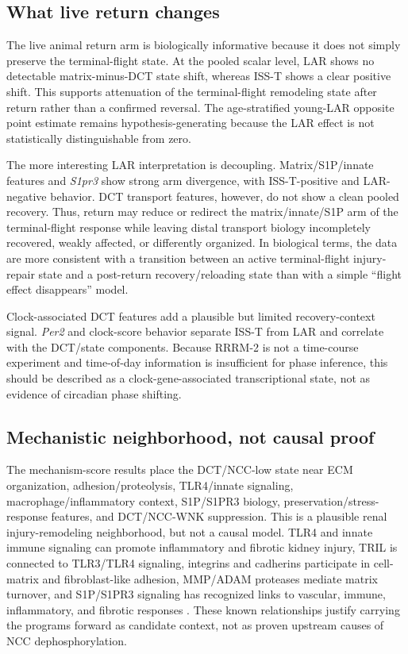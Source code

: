 \documentclass[11pt]{article}
\newcommand{\gene}[1]{\textit{#1}}
\begin{document}
\subsection{What live return changes}

The live animal return arm is biologically informative because it does not simply preserve the terminal-flight state. At the pooled scalar level, LAR shows no detectable matrix-minus-DCT state shift, whereas ISS-T shows a clear positive shift. This supports attenuation of the terminal-flight remodeling state after return rather than a confirmed reversal. The age-stratified young-LAR opposite point estimate remains hypothesis-generating because the LAR effect is not statistically distinguishable from zero.

The more interesting LAR interpretation is decoupling. Matrix/S1P/innate features and \gene{S1pr3} show strong arm divergence, with ISS-T-positive and LAR-negative behavior. DCT transport features, however, do not show a clean pooled recovery. Thus, return may reduce or redirect the matrix/innate/S1P arm of the terminal-flight response while leaving distal transport biology incompletely recovered, weakly affected, or differently organized. In biological terms, the data are more consistent with a transition between an active terminal-flight injury-repair state and a post-return recovery/reloading state than with a simple ``flight effect disappears'' model.

Clock-associated DCT features add a plausible but limited recovery-context signal. \gene{Per2} and clock-score behavior separate ISS-T from LAR and correlate with the DCT/state components. Because RRRM-2 is not a time-course experiment and time-of-day information is insufficient for phase inference, this should be described as a clock-gene-associated transcriptional state, not as evidence of circadian phase shifting.

\subsection{Mechanistic neighborhood, not causal proof}

The mechanism-score results place the DCT/NCC-low state near ECM organization, adhesion/proteolysis, TLR4/innate signaling, macrophage/inflammatory context, S1P/S1PR3 biology, preservation/stress-response features, and DCT/NCC-WNK suppression. This is a plausible renal injury-remodeling neighborhood, but not a causal model. TLR4 and innate immune signaling can promote inflammatory and fibrotic kidney injury, TRIL is connected to TLR3/TLR4 signaling, integrins and cadherins participate in cell-matrix and fibroblast-like adhesion, MMP/ADAM proteases mediate matrix turnover, and S1P/S1PR3 signaling has recognized links to vascular, immune, inflammatory, and fibrotic responses \citep{souza2015tlr4,carpenter2009tril,carpenter2011tril,wochal2014tril,s1p2017,s1p2020,s1p2009}. These known relationships justify carrying the programs forward as candidate context, not as proven upstream causes of NCC dephosphorylation.
\end{document}
